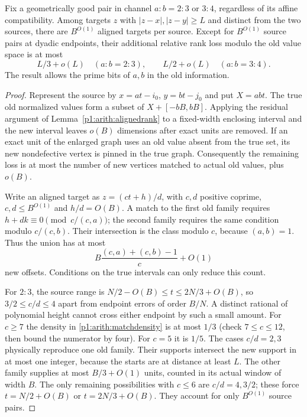 \begin{lemma}\label{p1:arith:palmrank}
Fix a geometrically good pair in channel $a:b=2:3$ or $3:4$, regardless
of its affine compatibility.  Among targets $z$ with
$|z-x|,|z-y|\geq L$ and distinct from the two sources, there are
$B^{O(1)}$ aligned targets per source.  Except for $B^{O(1)}$ source
pairs at dyadic endpoints, their additional relative rank loss modulo
the old value space is at most
\[
 L/3+o(L)\quad(a:b=2:3),\qquad
 L/2+o(L)\quad(a:b=3:4).
\]
The result allows the prime bits of $a,b$ in the old information.
\end{lemma}

\begin{proof}
Represent the source by $x=at-i_0$, $y=bt-j_0$ and put $X=abt$.
The true old normalized values form a subset of
$X+[-bB,bB]$.  Applying the residual argument of
Lemma~\ref{p1:arith:alignedrank} to a fixed-width enclosing interval and
the new interval leaves $o(B)$ dimensions after exact units are removed.
If an exact unit of the enlarged graph uses an old value absent from the
true set, its new nondefective vertex is pinned in the true graph.
Consequently the remaining loss is at most the number of new vertices
matched to actual old values, plus $o(B)$.

Write an aligned target as $z=(ct+h)/d$, with $c,d$ positive coprime,
$c,d\leq B^{O(1)}$ and $h/d=O(B)$.  A match to the first old family
requires
$h+dk\equiv0\pmod{c/(c,a)}$; the second family requires the same
condition modulo $c/(c,b)$.  Their intersection is the class modulo $c$,
because $(a,b)=1$.  Thus the union has at most
\begin{equation}\label{p1:arith:matchdensity}
 B\frac{(c,a)+(c,b)-1}{c}+O(1)
\end{equation}
new offsets.  Conditions on the true intervals can only reduce this count.

For $2:3$, the source range is
$N/2-O(B)\leq t\leq2N/3+O(B)$, so $3/2\leq c/d\leq4$ apart
from endpoint errors of order $B/N$.  A distinct rational of polynomial
height cannot cross either endpoint by such a small amount.
For $c\geq7$ the density in \eqref{p1:arith:matchdensity} is at most
$1/3$ (check $7\leq c\leq12$, then bound the numerator by four).
For $c=5$ it is $1/5$.  The cases $c/d=2,3$ physically reproduce one
old family.  Their supports intersect the new support in at most one
integer, because the starts are at distance at least $L$.  The other
family supplies at most $B/3+O(1)$ units, counted in its actual window
of width $B$.  The only remaining possibilities with $c\leq6$ are
$c/d=4,3/2$; these force $t=N/2+O(B)$ or $t=2N/3+O(B)$.
They account for only $B^{O(1)}$ source pairs.


\end{proof}
